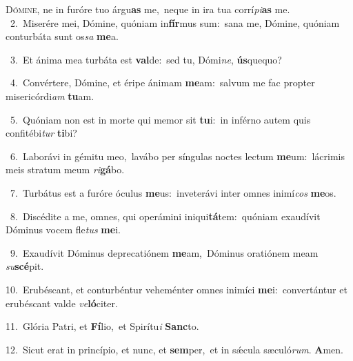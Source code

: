 \lettrine{\initial\textcolor{\initialcolor}{D}}{ómine,} ne in furóre tuo árgu\textbf{as} me,~\star neque in ira tua corrí\-\textit{pi}\-\textbf{as} me.\\
{\numbfont\textcolor{\numbcolor}{~2.}}~Miserére mei, Dómine, quóniam in\-\textbf{fír}\-mus sum:~\star sana me, Dómine, quóniam conturbáta sunt os\textit{sa} \textbf{me}\-a.\par
{\numbfont\textcolor{\numbcolor}{~3.}}~Et ánima mea turbáta est \textbf{val}\-de:~\star sed tu, Dómi\-\textit{ne}\-, \textbf{ús}\-quequo?\par
{\numbfont\textcolor{\numbcolor}{~4.}}~Convértere, Dómine, et éripe ánimam \textbf{me}\-am:~\star salvum me fac propter misericórdi\textit{am} \textbf{tu}\-am.\par
{\numbfont\textcolor{\numbcolor}{~5.}}~Quóniam non est in morte qui memor sit \textbf{tu}\-i:~\star in inférno autem quis confitébi\textit{tur} \textbf{ti}\-bi?\par
{\numbfont\textcolor{\numbcolor}{~6.}}~Laborávi in gémitu meo,~\dagger lavábo per síngulas noctes lectum \textbf{me}\-um:~\star lácrimis meis stratum meum \textit{ri}\-\textbf{gá}bo.\par
{\numbfont\textcolor{\numbcolor}{~7.}}~Turbátus est a furóre óculus \textbf{me}\-us:~\star inveterávi inter omnes inimí\textit{cos} \textbf{me}\-os.\par
{\numbfont\textcolor{\numbcolor}{~8.}}~Discédite a me, omnes, qui operámini iniqui\-\textbf{tá}\-tem:~\star quóniam exaudívit Dóminus vocem fle\textit{tus} \textbf{me}\-i.\par
{\numbfont\textcolor{\numbcolor}{~9.}}~Exaudívit Dóminus deprecatiónem \textbf{me}\-am,~\star Dóminus oratiónem meam \textit{su}\-\textbf{scé}pit.\par
{\numbfont\textcolor{\numbcolor}{10.}}~Erubéscant, et conturbéntur veheménter omnes inimíci \textbf{me}\-i:~\star convertántur et erubéscant valde \textit{ve}\-\textbf{ló}citer.\par
{\numbfont\textcolor{\numbcolor}{11.}}~Glória Patri, et \textbf{Fí}\-lio,~\star et Spirítu\textit{i} \textbf{Sanc}\-to.\par
{\numbfont\textcolor{\numbcolor}{12.}}~Sicut erat in princípio, et nunc, et \textbf{sem}\-per,~\star et in sǽcula sæculó\-\textit{rum}\-. \textbf{A}\-men.\par
